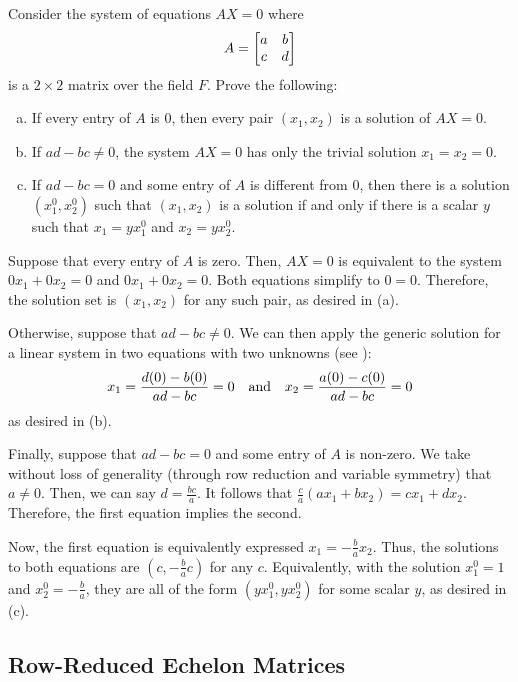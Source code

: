\documentclass[notes]{agony}
\begin{document}
\begin{xca}
  Consider the system of equations $AX = 0$ where \[ A = \mqty[a&b \\ c&d] \]
  is a $2 \times 2$ matrix over the field $F$. Prove the following:
  \setlength\parskip{0pt}
  \begin{enumerate}[(a)]
    \item If every entry of $A$ is 0, then every pair $(x_1, x_2)$ is a solution of $AX = 0$.
    \item If $ad-bc \neq 0$, the system $AX = 0$ has only the trivial solution $x_1 = x_2 = 0$.
    \item If $ad-bc = 0$ and some entry of $A$ is different from 0,
          then there is a solution $(x_1^0, x_2^0)$ such that
          $(x_1, x_2)$ is a solution if and only if there is a scalar $y$ such that
          $x_1 = yx_1^0$ and $x_2 = yx_2^0$.
  \end{enumerate}
\end{xca}
\begin{prf}
  Suppose that every entry of $A$ is zero.
  Then, $AX = 0$ is equivalent to the system $0x_1 + 0x_2 = 0$ and $0x_1 + 0x_2 = 0$.
  Both equations simplify to $0 = 0$.
  Therefore, the solution set is $(x_1, x_2)$ for any such pair, as desired in (a).

  Otherwise, suppose that $ad - bc \neq 0$.
  We can then apply the generic solution for a linear system in two equations with two unknowns
  (see ):
  \[ x_1 = \frac{d(0) - b(0)}{ad - bc} = 0 \qq{and} x_2 = \frac{a(0) - c(0)}{ad - bc} = 0 \]
  as desired in (b).

  Finally, suppose that $ad - bc = 0$ and some entry of $A$ is non-zero.
  We take without loss of generality (through row reduction and variable symmetry) that $a \neq 0$.
  Then, we can say $d = \frac{bc}{a}$.
  It follows that $\frac{c}{a}(ax_1 + bx_2) = cx_1 + dx_2$.
  Therefore, the first equation implies the second.

  Now, the first equation is equivalently expressed $x_1 = -\frac{b}{a}x_2$.
  Thus, the solutions to both equations are $(c, -\frac{b}{a}c)$ for any $c$.
  Equivalently, with the solution $x_1^0 = 1$ and $x_2^0 = -\frac{b}{a}$,
  they are all of the form $(yx_1^0, yx_2^0)$ for some scalar $y$, as desired in (c).
\end{prf}

\subsection{Row-Reduced Echelon Matrices}
\end{document}
